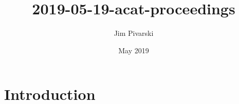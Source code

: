 \documentclass{article}
\title{2019-05-19-acat-proceedings}
\author{Jim Pivarski}
\date{May 2019}
\begin{document}
\maketitle

\section{Introduction}
\end{document}
